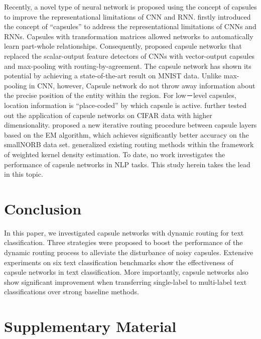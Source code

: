 \documentclass[11pt]{article}
\begin{document}
Recently, a novel type of neural network is proposed using the concept of capsules to improve the representational limitations of CNN and RNN. 
  firstly introduced the concept of ``capsules'' to address the representational limitations of CNNs and RNNs. Capsules with transformation matrices allowed networks to automatically learn part-whole relationships. 
Consequently,  proposed  capsule networks that replaced the scalar-output feature detectors of CNNs with vector-output capsules and max-pooling with routing-by-agreement. The capsule network has shown its potential by achieving a state-of-the-art result on MNIST data. 
Unlike max-pooling in CNN, however, Capsule network do not throw away information about the precise position of the entity within the region. For low－level capsules, location information is “place-coded” by which capsule is active.
\cite{xi2017capsule} further tested out the application of capsule networks on CIFAR data with higher dimensionality.
\cite{hinton2018capsule} proposed a new iterative routing procedure between capsule layers based on the EM algorithm, which achieves significantly better accuracy on the smallNORB data set. 
\cite{zhang2018fast} generalized existing routing methods within the framework of weighted kernel density estimation.
To date, no work investigates the performance of capsule networks in NLP tasks. This study herein takes the lead in this topic.


\section{Conclusion}
In this paper, we investigated capsule networks with dynamic routing for text classification. Three strategies were proposed to boost the performance of the dynamic routing process to alleviate the disturbance of noisy capsules. Extensive experiments on six text classification benchmarks show the effectiveness of capsule networks in text classification. More importantly, capsule networks also show significant improvement when transferring single-label to multi-label text classifications over strong baseline methods. 






\clearpage


\onecolumn
\section*{Supplementary Material}
\setcounter{table}{0}
\renewcommand\thetable{A.\arabic{table}}
\end{document}
